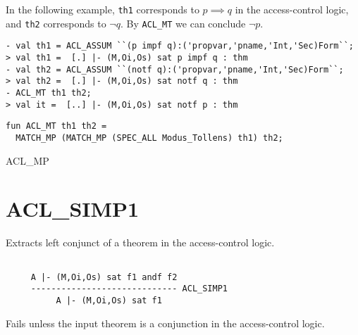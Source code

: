 \EXAMPLE
In the following example, \texttt{th1} corresponds to $p \implies q$
in the access-control logic, and \texttt{th2} corresponds to $\neg
q$. By \texttt{ACL\_MT} we can conclude $\neg p$.
\begin{holboxed}
\begin{verbatim}
- val th1 = ACL_ASSUM ``(p impf q):('propvar,'pname,'Int,'Sec)Form``;
> val th1 =  [.] |- (M,Oi,Os) sat p impf q : thm
- val th2 = ACL_ASSUM ``(notf q):('propvar,'pname,'Int,'Sec)Form``;
> val th2 =  [.] |- (M,Oi,Os) sat notf q : thm
- ACL_MT th1 th2;
> val it =  [..] |- (M,Oi,Os) sat notf p : thm
\end{verbatim}
\end{holboxed}
\IMPLEMENTATION
\begin{holboxed}
\begin{verbatim}
fun ACL_MT th1 th2 = 
  MATCH_MP (MATCH_MP (SPEC_ALL Modus_Tollens) th1) th2;
\end{verbatim}
\end{holboxed}

\SEEALSO
ACL\_MP
\ENDDOC

\section{ACL\_SIMP1}



\egroup

\SYNOPSIS
Extracts left conjunct of a theorem in the access-control logic.

\DESCRIBE
\begin{verbatim}

     A |- (M,Oi,Os) sat f1 andf f2
     ----------------------------- ACL_SIMP1
          A |- (M,Oi,Os) sat f1
\end{verbatim}

\FAILURE
Fails unless the input theorem is a conjunction in the
access-control logic.

